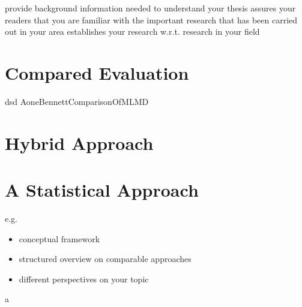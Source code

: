provide background information needed to understand your thesis
assures your readers that you are familiar with the important research that has been carried out in your area
establishes your research w.r.t. research in your field

\section{Compared Evaluation}
dsd
AoneBennettComparisonOfMLMD

\section{Hybrid Approach}

\section{A Statistical Approach}

e.g.\
\begin{itemize}
  \item conceptual framework
  \item structured overview on comparable approaches
  \item different perspectives on your topic
\end{itemize}

 a